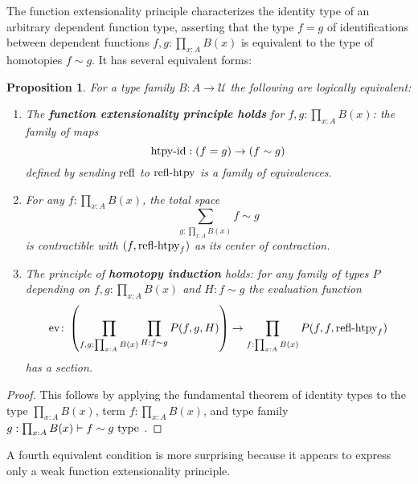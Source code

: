 \documentclass{amsart}
\theoremstyle{theorem}
\newtheorem*{prop}{Proposition}
\theoremstyle{definition}
\theoremstyle{remark}
\newcommand{\0}{\mathbbe{0}}
\newcommand{\1}{\mathbbe{1}}
\newcommand{\2}{\mathbbe{2}}
\newcommand{\3}{\mathbbe{3}}
\newcommand{\4}{\mathbbe{4}}
\newcommand{\univ}{{~\textup{type}~}}
\newcommand{\term}[1]{{\textup{#1}}}
\newcommand{\refl}{\term{refl}}
\newcommand{\UU}{{\mathcal{U}}}
\newcommand{\ev}{\term{ev}}
\begin{document}
The function extensionality principle characterizes the identity type of an arbitrary dependent function type, asserting that the type $f=g$ of identifications between dependent functions $f,g : \prod_{x:A} B(x)$ is equivalent to the type of homotopies $f \sim g$. It has several equivalent forms:

\begin{prop} For a type family $B : A \to \UU$ the following are logically equivalent:
\begin{enumerate}
\item The \textbf{function extensionality principle holds} for $f,g : \prod_{x:A}B(x)$: the family of maps
\[ \term{htpy-id} : (f=g) \to (f \sim g)\]
defined by sending $\refl$ to $\term{refl-htpy}$ is a family of equivalences.
\item For any $f : \prod_{x:A}B(x)$, the total space
\[ \sum_{g : \prod_{x:A}B(x)} f \sim g\]
is contractible with $(f, \term{refl-htpy}_f)$ as its center of contraction.
\item The principle of \textbf{homotopy induction} holds: for any family of types $P$ depending on $f,g : \prod_{x:A}B(x)$ and $H : f \sim g$ the evaluation function
\[ \ev\colon \left( \prod_{f,g : \prod_{x:A}B(x)} \prod_{H : f \sim g} P(f,g,H) \right) \to \prod_{f : \prod_{x:A}B(x)} P(f,f, \term{refl-htpy}_f)\]
has a section.
\end{enumerate}
\end{prop}
\begin{proof}
This follows by applying the fundamental theorem of identity types to the type $\prod_{x:A}B(x)$, term $f : \prod_{x:A}B(x)$, and type family $g : \prod_{x:A}B(x) \vdash f \sim g \univ$.
\end{proof}

A fourth equivalent condition is more surprising because it appears to express only a weak function extensionality principle.
\end{document}
